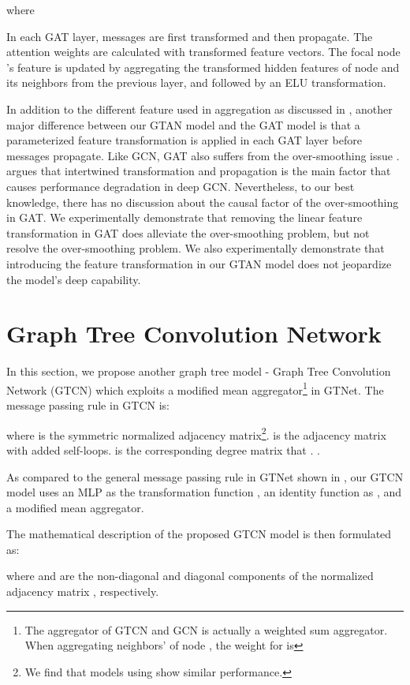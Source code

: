 \documentclass[lettersize,journal]{IEEEtran}
\theoremstyle{plain}
\theoremstyle{definition}
\theoremstyle{remark}
\begin{document}
where


In each GAT layer, messages are first transformed and then propagate. The attention weights are calculated with transformed feature vectors. The focal node 's feature is updated by aggregating the transformed hidden features of node  and its neighbors from the previous layer, and followed by an ELU transformation.

In addition to the different feature used in aggregation as discussed in , another major difference between our GTAN model and the GAT model is that a parameterized feature transformation is applied in each GAT layer before messages propagate. Like GCN, GAT also suffers from the over-smoothing issue \cite{wang2019improving}. \cite{liu2020towards} argues that intertwined transformation and propagation is the main factor that causes performance degradation in deep GCN. Nevertheless, to our best knowledge, there has no discussion about the causal factor of the over-smoothing in GAT. We experimentally demonstrate that removing the linear feature transformation in GAT does alleviate the over-smoothing problem, but not resolve the over-smoothing problem. We also experimentally demonstrate that introducing the feature transformation in our GTAN model does not jeopardize the model's deep capability.

\section{Graph Tree Convolution Network}
\label{GTCN}
In this section, we propose another graph tree model - Graph Tree Convolution Network (GTCN) which exploits a modified mean aggregator\footnote{The aggregator of GTCN and GCN is actually a weighted sum aggregator. When aggregating neighbors' of node , the weight for  is } in GTNet. The message passing rule in GTCN is:

where  is the symmetric normalized adjacency matrix\footnote{We find that models using  show similar performance.}.  is the adjacency matrix with added self-loops.  is the corresponding degree matrix that . .

As compared to the general message passing rule in GTNet shown in , our GTCN model uses an MLP as the transformation function , an identity function as , and a modified mean aggregator.

The mathematical description of the proposed GTCN model is then formulated as:

where  and  are the non-diagonal and diagonal components of the normalized adjacency matrix , respectively.
\end{document}
